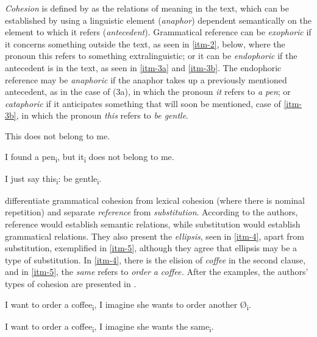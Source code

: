 \documentclass{textolivre}
\begin{document}
\emph{Cohesion} is defined by \textcite[p.~4]{halliday_cohesion_1976} as the relations
of meaning in the text, which can be established by using a linguistic element
(\emph{anaphor}) dependent semantically on the element to which it refers
(\emph{antecedent}). Grammatical reference can be \emph{exophoric} if it concerns something
outside the text, as seen in \ref{itm-2}, below, where the pronoun this refers to
something extralinguistic; or it can be \emph{endophoric} if the antecedent is in the
text, as seen in \ref{itm-3a} and \ref{itm-3b}. The endophoric reference may be \emph{anaphoric} if
the anaphor takes up a previously mentioned antecedent, as in the case of (3a),
in which the pronoun \emph{it} refers to \emph{a pen}; or \emph{cataphoric} if it anticipates
something that will soon be mentioned, case of \ref{itm-3b}, in which the pronoun \emph{this}
refers to \emph{be gentle}.

%
%
\begin{description}[topsep=1ex,partopsep=1ex]
  \item[(2)\label{itm-2}] This does not belong to me. 
  \item[(3a)\label{itm-3a}] I found a pen\textsubscript{i}, but it\textsubscript{i} does not belong to me. 
  \item[(3b)\label{itm-3b}] I just say this\textsubscript{i}: be gentle\textsubscript{i}.
\end{description}

\textcite{halliday_cohesion_1976} differentiate grammatical cohesion from
lexical cohesion (where there is nominal repetition) and separate
\emph{reference} from \emph{substitution}. According to the authors,
reference would establish semantic relations, while substitution would
establish grammatical relations. They also present the \emph{ellipsis},
seen in \ref{itm-4}, apart from substitution, exemplified in \ref{itm-5}, although they
agree that ellipsis may be a type of substitution. In \ref{itm-4}, there is the
elision of \emph{coffee} in the second clause, and in \ref{itm-5}, the
\emph{same} refers to \emph{order} \emph{a coffee.} After the examples,
the authors' types of cohesion are presented in .


%
%
\begin{description}[topsep=1ex,partopsep=1ex]
  \item[(4)\label{itm-4}] I want to order a coffee\textsubscript{i}, I imagine she wants to order another Ø\textsubscript{i}. 
  \item[(5)\label{itm-5}] I want to order a coffee\textsubscript{i}, I imagine she wants the same\textsubscript{i}. 
\end{description}
\end{document}
